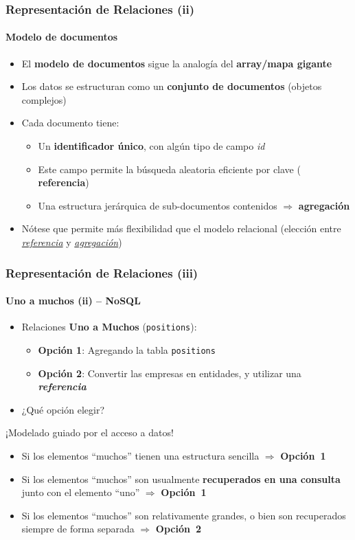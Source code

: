 \documentclass[14pt]{beamer}
\begin{document}
\begin{frame}
  \frametitle{Representación de Relaciones (ii)}
\framesubtitle{Modelo de documentos}
\begin{itemize}
\item El {\bf modelo de documentos} sigue la analogía del {\bf array/mapa
    gigante}
\item Los datos se estructuran como un {\bf conjunto de documentos}
  (objetos complejos)
\item Cada documento tiene:
  \begin{itemize}
\item Un {\bf identificador único}, con algún tipo de campo {\em id\/}
\item Este campo permite la búsqueda aleatoria eficiente por clave ({\bf
    referencia})
\item Una estructura jerárquica de sub-documentos contenidos $\Rightarrow$
  {\bf agregación}
\end{itemize}
\item Nótese que permite más flexibilidad que el modelo relacional
  (elección entre \underline{\em referencia} y \underline{\em agregación})
\end{itemize}
\end{frame}

\begin{frame}
  \frametitle{Representación de Relaciones (iii)}
\framesubtitle{Uno a muchos (ii) -- NoSQL}
\begin{itemize}
\item Relaciones {\bf Uno a Muchos} ({\tt positions}):
  \begin{itemize}
  \item {\bf Opción 1}: Agregando la tabla {\tt positions}
  \item {\bf Opción 2}: Convertir las empresas en entidades, y utilizar una
    {\bfseries\itshape referencia}
  \end{itemize}
\item ¿Qué opción elegir?
\end{itemize}
\pause
\vspace*{-.8ex}
\begin{alertblock}{¡Modelado guiado por el acceso a datos!}
\begin{small}
  \begin{itemize}
  \item Si los elementos ``muchos'' tienen una estructura sencilla
    $\Rightarrow$ {\bf Opción~1}
\item Si los elementos ``muchos'' son usualmente {\bf recuperados en una
    consulta} junto con el elemento ``uno'' $\Rightarrow$ {\bf Opción~1}
\item Si los elementos ``muchos'' son relativamente grandes, o bien son
  recuperados siempre de forma separada $\Rightarrow$ {\bf Opción~2}
  \end{itemize}
\end{small}
\end{alertblock}
\end{frame}
\end{document}
